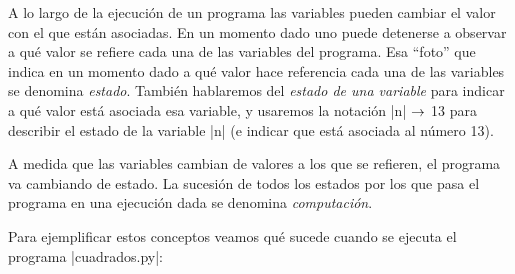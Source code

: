 A lo largo de la ejecución de un programa las variables pueden
cambiar el valor con el que están asociadas. En un momento dado
uno puede detenerse a observar a qué valor se refiere cada una de
las variables del programa. Esa ``foto'' que indica en un momento dado
a qué valor hace referencia cada una de las variables se denomina
\emph{estado}. También hablaremos del \emph{estado de una variable}
para indicar a qué valor está asociada esa variable, y usaremos la
notación |n| $\rightarrow$ 13 para describir el estado de la variable |n| (e indicar
que está asociada al número 13).

A medida que las variables cambian de valores a los que se
refieren, el programa va cambiando de estado. La sucesión de todos
los estados por los que pasa el programa en una ejecución dada se
denomina \emph{computación}.

Para ejemplificar estos conceptos veamos qué sucede cuando se
ejecuta el programa |cuadrados.py|:

